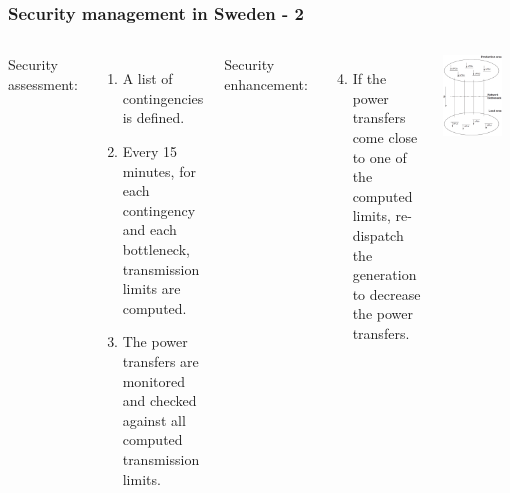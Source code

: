 \documentclass{beamer}
\begin{document}
\begin{frame}
\frametitle{Security management in Sweden - 2}
\begin{columns}
Security assessment:
\begin{enumerate}
\item A list of contingencies is defined.
\item Every 15 minutes, for each contingency and each bottleneck, transmission limits are computed.
\item The power transfers are monitored and checked against all computed transmission limits.
\end{enumerate}
Security enhancement:
\begin{enumerate}
\setcounter{enumi}{3}
\item If the power transfers come close to one of the computed limits, re-dispatch the generation to decrease the power transfers.
\end{enumerate}
\begin{center}
\includegraphics[width=0.85\textwidth]{Figs/SPICAjob}
\end{center}
\end{columns}
\end{frame}
\end{document}

